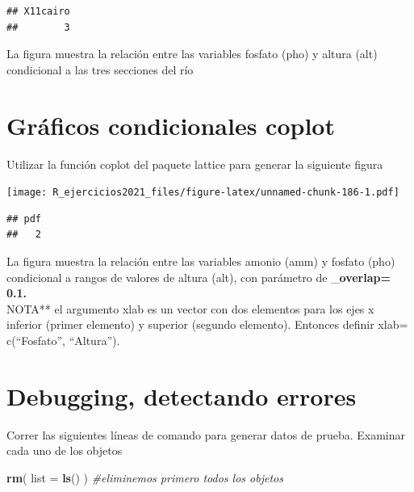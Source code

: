 \documentclass[]{book}
\newenvironment{Shaded}{\begin{snugshade}}{\end{snugshade}}
\newcommand{\CommentTok}[1]{\textcolor[rgb]{0.56,0.35,0.01}{\textit{#1}}}
\newcommand{\DataTypeTok}[1]{\textcolor[rgb]{0.13,0.29,0.53}{#1}}
\newcommand{\KeywordTok}[1]{\textcolor[rgb]{0.13,0.29,0.53}{\textbf{#1}}}
\newcommand{\NormalTok}[1]{#1}
\begin{document}
\begin{verbatim}
## X11cairo 
##        3
\end{verbatim}

La figura muestra la relación entre las variables fosfato (pho) y altura (alt) condicional a las tres secciones del río

\hypertarget{gruxe1ficos-condicionales-coplot}{%
\section{Gráficos condicionales coplot}\label{gruxe1ficos-condicionales-coplot}}

Utilizar la función coplot del paquete lattice para generar la siguiente figura

\texttt{[image: R\_ejercicios2021\_files/figure-latex/unnamed-chunk-186-1.pdf]}

\begin{verbatim}
## pdf 
##   2
\end{verbatim}

La figura muestra la relación entre las variables amonio (amm) y fosfato (pho) condicional a rangos de valores de altura (alt), con parámetro de \_\textbf{overlap= 0.1.\\
}NOTA** el argumento xlab es un vector con dos elementos para los ejes x inferior (primer elemento) y superior (segundo elemento). Entonces definir xlab= c(``Fosfato'', ``Altura'').

\hypertarget{debugging-detectando-errores-5}{%
\section{Debugging, detectando errores}\label{debugging-detectando-errores-5}}

Correr las siguientes líneas de comando para generar datos de prueba. Examinar cada uno de los objetos

\begin{Shaded}
\begin{Highlighting}[]
\KeywordTok{rm}\NormalTok{( }\DataTypeTok{list =} \KeywordTok{ls}\NormalTok{() ) }\CommentTok{#eliminemos primero todos los objetos}
\end{Highlighting}
\end{Shaded}
\end{document}
